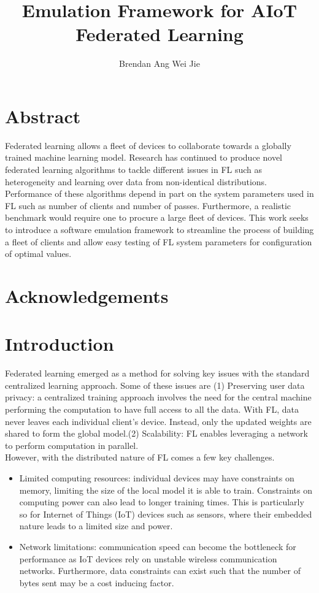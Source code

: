 \documentclass[12pt]{article}
\title{Emulation Framework for AIoT Federated Learning}
\author{Brendan Ang Wei Jie}
\begin{document}
\maketitle

\pagebreak
\section{Abstract}
Federated learning allows a fleet of devices to collaborate towards a globally trained machine
learning model. Research has continued to produce novel federated learning algorithms to tackle
different issues in FL such as heterogeneity and learning over data from non-identical
distributions. Performance of these algorithms depend in part on the system parameters used in FL
such as number of clients and number of passes. Furthermore, a realistic benchmark would require
one to procure a large fleet of devices. This work seeks to introduce a software emulation framework to
streamline the process of building a fleet of clients and allow easy testing of FL system
parameters for configuration of optimal values.
\pagebreak
  \section{Acknowledgements}
\pagebreak
\tableofcontents
\pagebreak
\section{Introduction}
Federated learning emerged as a method for solving key issues with the standard centralized learning
approach. Some of these issues are (1) Preserving user data privacy: a centralized training approach involves the need for the central
machine performing the computation to have full access to all the data. With FL, data never
leaves each individual client's device. Instead, only the updated weights are shared to form the
global model.(2) Scalability: FL enables leveraging a network to perform computation in parallel.
\\
However, with the distributed nature of FL comes a few key challenges.
\begin{itemize}
  \item Limited computing resources: individual devices may have constraints on memory, limiting the
    size of the local model it is able to train. Constraints on computing power can also lead to
    longer training times. This is particularly so for Internet of Things (IoT) devices such as
    sensors, where their embedded nature leads to a limited size and power.
  \item Network limitations: communication speed can become the bottleneck for performance as IoT
    devices rely on unstable wireless communication networks. Furthermore, data constraints can
    exist such that the number of bytes sent may be a cost inducing factor.
\end{itemize}
\end{document}
